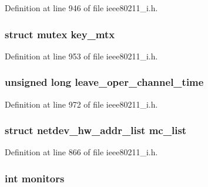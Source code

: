 Definition at line 946 of file ieee80211\-\_\-i.\-h.

\hypertarget{structieee80211__local_aa4d4909b9696da095fd82e003eee670b}{
\subsubsection[{key\-\_\-mtx}]{\setlength{\rightskip}{0pt plus 5cm}struct mutex key\-\_\-mtx}}\label{structieee80211__local_aa4d4909b9696da095fd82e003eee670b}


Definition at line 953 of file ieee80211\-\_\-i.\-h.

\hypertarget{structieee80211__local_aad9daf693bf88c202d2832eb6500c08d}{
\subsubsection[{leave\-\_\-oper\-\_\-channel\-\_\-time}]{\setlength{\rightskip}{0pt plus 5cm}unsigned long leave\-\_\-oper\-\_\-channel\-\_\-time}}\label{structieee80211__local_aad9daf693bf88c202d2832eb6500c08d}


Definition at line 972 of file ieee80211\-\_\-i.\-h.

\hypertarget{structieee80211__local_a00dc9ea6f5dc07b551f8ae14dd3a4eff}{
\subsubsection[{mc\-\_\-list}]{\setlength{\rightskip}{0pt plus 5cm}struct netdev\-\_\-hw\-\_\-addr\-\_\-list mc\-\_\-list}}\label{structieee80211__local_a00dc9ea6f5dc07b551f8ae14dd3a4eff}


Definition at line 866 of file ieee80211\-\_\-i.\-h.

\hypertarget{structieee80211__local_a0bd1594e17d034f96ba795dabeaee577}{
\subsubsection[{monitors}]{\setlength{\rightskip}{0pt plus 5cm}int monitors}}\label{structieee80211__local_a0bd1594e17d034f96ba795dabeaee577}


